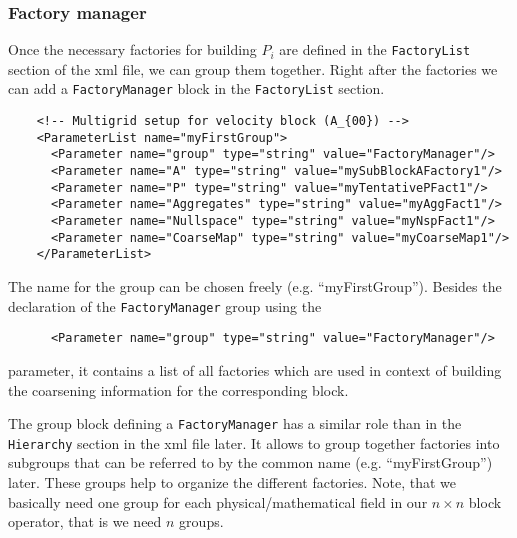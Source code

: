 \documentclass[10pt,fleqn]{book}
\begin{document}
\subsubsection{Factory manager}
Once the necessary factories for building $P_i$ are defined in the \texttt{FactoryList} section of the xml file, we can group them together.  Right after the factories we can add a \texttt{FactoryManager} block in the \texttt{FactoryList} section.

\begin{lstlisting}
    <!-- Multigrid setup for velocity block (A_{00}) -->
    <ParameterList name="myFirstGroup">
      <Parameter name="group" type="string" value="FactoryManager"/>
      <Parameter name="A" type="string" value="mySubBlockAFactory1"/>
      <Parameter name="P" type="string" value="myTentativePFact1"/>
      <Parameter name="Aggregates" type="string" value="myAggFact1"/>
      <Parameter name="Nullspace" type="string" value="myNspFact1"/>
      <Parameter name="CoarseMap" type="string" value="myCoarseMap1"/>
    </ParameterList>
\end{lstlisting}

The name for the group can be chosen freely (e.g. ``myFirstGroup''). Besides the declaration of the \texttt{FactoryManager} group using the 
\begin{lstlisting}
      <Parameter name="group" type="string" value="FactoryManager"/>
\end{lstlisting}
parameter, it contains a list of all factories which are used in context of building the coarsening information for the corresponding block.

The group block defining a \texttt{FactoryManager} has a similar role than in the \texttt{Hierarchy} section in the xml file later. It allows to group together factories into subgroups that can be referred to by the common name (e.g. ``myFirstGroup'') later. These groups help to organize the different factories. Note, that we basically need one group for each physical/mathematical field in our $n\times n$ block operator, that is we need $n$ groups.
\end{document}
